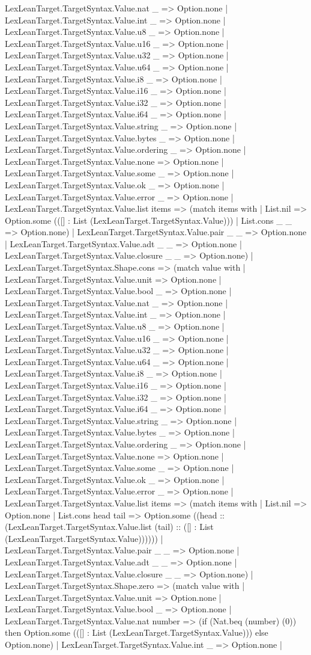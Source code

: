 \documentclass[11pt]{article}
\begin{document}
LexLeanTarget.TargetSyntax.Value.nat \_ => Option.none | LexLeanTarget.TargetSyntax.Value.int \_ => Option.none | LexLeanTarget.TargetSyntax.Value.u8 \_ => Option.none | LexLeanTarget.TargetSyntax.Value.u16 \_ => Option.none | LexLeanTarget.TargetSyntax.Value.u32 \_ => Option.none | LexLeanTarget.TargetSyntax.Value.u64 \_ => Option.none | LexLeanTarget.TargetSyntax.Value.i8 \_ => Option.none | LexLeanTarget.TargetSyntax.Value.i16 \_ => Option.none | LexLeanTarget.TargetSyntax.Value.i32 \_ => Option.none | LexLeanTarget.TargetSyntax.Value.i64 \_ => Option.none | LexLeanTarget.TargetSyntax.Value.string \_ => Option.none | LexLeanTarget.TargetSyntax.Value.bytes \_ => Option.none | LexLeanTarget.TargetSyntax.Value.ordering \_ => Option.none | LexLeanTarget.TargetSyntax.Value.none => Option.none | LexLeanTarget.TargetSyntax.Value.some \_ => Option.none | LexLeanTarget.TargetSyntax.Value.ok \_ => Option.none | LexLeanTarget.TargetSyntax.Value.error \_ => Option.none | LexLeanTarget.TargetSyntax.Value.list items => (match items with | List.nil => Option.some (([] : List (LexLeanTarget.TargetSyntax.Value))) | List.cons \_ \_ => Option.none) | LexLeanTarget.TargetSyntax.Value.pair \_ \_ => Option.none | LexLeanTarget.TargetSyntax.Value.adt \_ \_ => Option.none | LexLeanTarget.TargetSyntax.Value.closure \_ \_ => Option.none) | LexLeanTarget.TargetSyntax.Shape.cons => (match value with | LexLeanTarget.TargetSyntax.Value.unit => Option.none | LexLeanTarget.TargetSyntax.Value.bool \_ => Option.none | LexLeanTarget.TargetSyntax.Value.nat \_ => Option.none | LexLeanTarget.TargetSyntax.Value.int \_ => Option.none | LexLeanTarget.TargetSyntax.Value.u8 \_ => Option.none | LexLeanTarget.TargetSyntax.Value.u16 \_ => Option.none | LexLeanTarget.TargetSyntax.Value.u32 \_ => Option.none | LexLeanTarget.TargetSyntax.Value.u64 \_ => Option.none | LexLeanTarget.TargetSyntax.Value.i8 \_ => Option.none | LexLeanTarget.TargetSyntax.Value.i16 \_ => Option.none | LexLeanTarget.TargetSyntax.Value.i32 \_ => Option.none | LexLeanTarget.TargetSyntax.Value.i64 \_ => Option.none | LexLeanTarget.TargetSyntax.Value.string \_ => Option.none | LexLeanTarget.TargetSyntax.Value.bytes \_ => Option.none | LexLeanTarget.TargetSyntax.Value.ordering \_ => Option.none | LexLeanTarget.TargetSyntax.Value.none => Option.none | LexLeanTarget.TargetSyntax.Value.some \_ => Option.none | LexLeanTarget.TargetSyntax.Value.ok \_ => Option.none | LexLeanTarget.TargetSyntax.Value.error \_ => Option.none | LexLeanTarget.TargetSyntax.Value.list items => (match items with | List.nil => Option.none | List.cons head tail => Option.some ((head :: (LexLeanTarget.TargetSyntax.Value.list (tail) :: ([] : List (LexLeanTarget.TargetSyntax.Value)))))) | LexLeanTarget.TargetSyntax.Value.pair \_ \_ => Option.none | LexLeanTarget.TargetSyntax.Value.adt \_ \_ => Option.none | LexLeanTarget.TargetSyntax.Value.closure \_ \_ => Option.none) | LexLeanTarget.TargetSyntax.Shape.zero => (match value with | LexLeanTarget.TargetSyntax.Value.unit => Option.none | LexLeanTarget.TargetSyntax.Value.bool \_ => Option.none | LexLeanTarget.TargetSyntax.Value.nat number => (if (Nat.beq (number) (0)) then Option.some (([] : List (LexLeanTarget.TargetSyntax.Value))) else Option.none) | LexLeanTarget.TargetSyntax.Value.int \_ => Option.none | 
\end{document}
